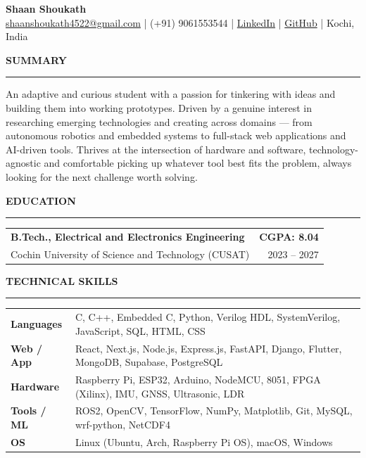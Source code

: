 \documentclass[10.8pt, a4paper]{article}
\newcommand{\cvsection}[1]{%
  \vspace{7pt}%
  {\color{accent}\textbf{\MakeUppercase{#1}}}\\[-5pt]
  {\color{rulecol}\rule{\linewidth}{0.5pt}}%
  \vspace{2pt}%
}
\begin{document}
\begin{center}
  {\Large\textbf{Shaan Shoukath}}\\[3pt]
  \small
  \href{mailto:shaanshoukath4522@gmail.com}{shaanshoukath4522@gmail.com}
  \;|\; (+91) 9061553544
  \;|\; \href{https://www.linkedin.com/in/shaan-shoukath-04a9b12b2/}{LinkedIn}
  \;|\; \href{https://github.com/Shaan-Shoukath}{GitHub}
  \;|\; Kochi, India
\end{center}

\cvsection{Summary}
{\small An adaptive and curious student with a passion for tinkering with ideas and building them into working prototypes. Driven by a genuine interest in researching emerging technologies and creating across domains — from autonomous robotics and embedded systems to full-stack web applications and AI-driven tools. Thrives at the intersection of hardware and software, technology-agnostic and comfortable picking up whatever tool best fits the problem, always looking for the next challenge worth solving.}

\cvsection{Education}
\begin{tabularx}{\linewidth}{@{} X r @{}}
  \small\textbf{B.Tech., Electrical and Electronics Engineering} & \small\textbf{CGPA: 8.04} \\
  \small Cochin University of Science and Technology (CUSAT) & \small 2023 – 2027 \\
\end{tabularx}

\cvsection{Technical Skills}
\begin{tabularx}{\linewidth}{@{} l @{\hspace{6pt}} X @{}}
  \small\textbf{Languages}  & \small C, C++, Embedded C, Python, Verilog HDL, SystemVerilog, JavaScript, SQL, HTML, CSS \\
  \small\textbf{Web / App}  & \small React, Next.js, Node.js, Express.js, FastAPI, Django, Flutter, MongoDB, Supabase, PostgreSQL \\
  \small\textbf{Hardware}   & \small Raspberry Pi, ESP32, Arduino, NodeMCU, 8051, FPGA (Xilinx), IMU, GNSS, Ultrasonic, LDR \\
  \small\textbf{Tools / ML} & \small ROS2, OpenCV, TensorFlow, NumPy, Matplotlib, Git, MySQL, wrf-python, NetCDF4 \\
  \small\textbf{OS}         & \small Linux (Ubuntu, Arch, Raspberry Pi OS), macOS, Windows \\
\end{tabularx}
\end{document}
